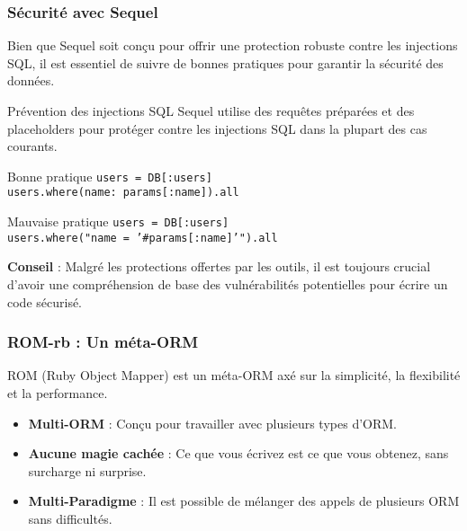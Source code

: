 \begin{frame}
  \frametitle{Sécurité avec Sequel}

  \small
  Bien que Sequel soit conçu pour offrir une protection robuste contre les injections SQL, il est essentiel de suivre de bonnes pratiques pour garantir la sécurité des données.

  \begin{block}{Prévention des injections SQL}
    Sequel utilise des requêtes préparées et des placeholders pour protéger contre les injections SQL dans la plupart des cas courants.
  \end{block}

  \begin{exampleblock}{Bonne pratique}
    \small
    \texttt{users = DB[:users] \\
    users.where(name: params[:name]).all}
  \end{exampleblock}

  \begin{alertblock}{Mauvaise pratique}
    \small
    \texttt{users = DB[:users] \\
    users.where("name = '\#{params[:name]}'").all}
  \end{alertblock}

  \textbf{Conseil} : Malgré les protections offertes par les outils, il est toujours crucial d'avoir une compréhension de base des vulnérabilités potentielles pour écrire un code sécurisé.

\end{frame}

\begin{frame}
  \frametitle{ROM-rb : Un méta-ORM}

  ROM (Ruby Object Mapper) est un méta-ORM axé sur la simplicité, la flexibilité et la performance.

  \begin{itemize}
    \item \textbf{Multi-ORM} : Conçu pour travailler avec plusieurs types d'ORM.
    \item \textbf{Aucune magie cachée} : Ce que vous écrivez est ce que vous obtenez, sans surcharge ni surprise.
    \item \textbf{Multi-Paradigme} : Il est possible de mélanger des appels de plusieurs ORM sans difficultés.
  \end{itemize}

\end{frame}

